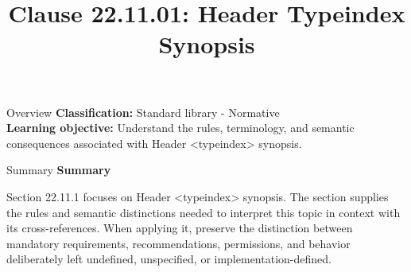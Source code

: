 \documentclass[10pt,letterpaper]{article}
\title{Clause 22.11.01: Header Typeindex Synopsis}
\author{}
\date{}
\begin{document}
\maketitle
\begin{CornellOverviewBox}{Overview}
\textbf{Classification:} Standard library - Normative\\[2pt]
\textbf{Learning objective:} Understand the rules, terminology, and semantic consequences associated with Header <typeindex> synopsis.
\end{CornellOverviewBox}\begin{CornellSummaryBox}{Summary}
{\sffamily\bfseries\color{Accent} Summary}\par\vspace{3pt}Section 22.11.1 focuses on Header <typeindex> synopsis. The section supplies the rules and semantic distinctions needed to interpret this topic in context with its cross-references. When applying it, preserve the distinction between mandatory requirements, recommendations, permissions, and behavior deliberately left undefined, unspecified, or implementation-defined.
\end{CornellSummaryBox}
\end{document}
